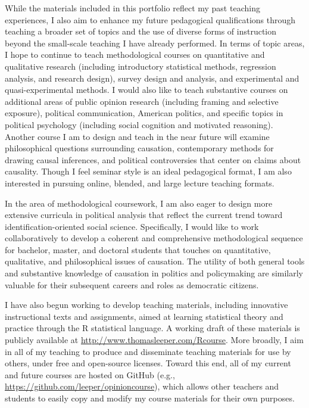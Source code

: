 \documentclass[12pt]{article}
\begin{document}
While the materials included in this portfolio reflect my past teaching experiences, I also aim to enhance my future pedagogical qualifications through teaching a broader set of topics and the use of diverse forms of instruction beyond the small-scale teaching I have already performed. In terms of topic areas, I hope to continue to teach methodological courses on quantitative and qualitative research (including introductory statistical methods, regression analysis, and research design), survey design and analysis, and experimental and quasi-experimental methods. I would also like to teach substantive courses on additional areas of public opinion research (including framing and selective exposure), political communication, American politics, and specific topics in political psychology (including social cognition and motivated reasoning). Another course I am to design and teach in the near future will examine philosophical questions surrounding causation, contemporary methods for drawing causal inferences, and political controversies that center on claims about causality. Though I feel seminar style is an ideal pedagogical format, I am also interested in pursuing online, blended, and large lecture teaching formats.

In the area of methodological coursework, I am also eager to design more extensive curricula in political analysis that reflect the current trend toward identification-oriented social science. Specifically, I would like to work collaboratively to develop a coherent and comprehensive methodological sequence for bachelor, master, and doctoral students that touches on quantitative, qualitative, and philosophical issues of causation. The utility of both general tools and substantive knowledge of causation in politics and policymaking are similarly valuable for their subsequent careers and roles as democratic citizens.

I have also begun working to develop teaching materials, including innovative instructional texts and assignments, aimed at learning statistical theory and practice through the R statistical language. A working draft of these materials is publicly available at \url{http://www.thomasleeper.com/Rcourse}. More broadly, I aim in all of my teaching to produce and disseminate teaching materials for use by others, under free and open-source licenses. Toward this end, all of my current and future courses are hosted on GitHub (e.g., \url{https://github.com/leeper/opinioncourse}), which allows other teachers and students to easily copy and modify my course materials for their own purposes.
\end{document}
